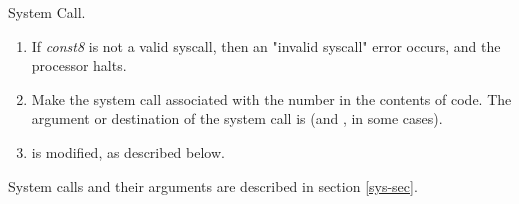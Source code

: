 


System Call.
	
\begin{enumerate}

\item If {\em const8} is not a valid syscall, then an
	"invalid syscall" error occurs, and the
	processor halts.

\item Make the system call associated with the number
	in the contents of code.  The argument or
	destination of the system call is 
	(and , in some cases).

\item {} is modified, as described below.

\end{enumerate}

System calls and their arguments are described in
section \ref{sys-sec}.

